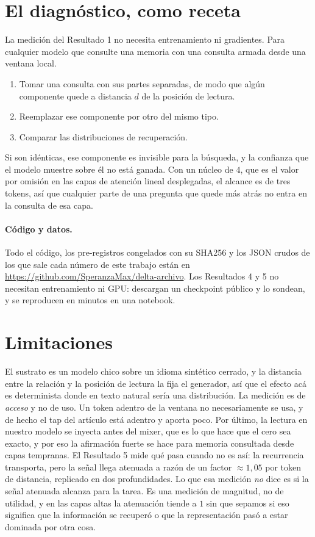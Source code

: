 \documentclass[11pt,a4paper]{article}
\begin{document}
\section{El diagnóstico, como receta}

La medición del Resultado 1 no necesita entrenamiento ni gradientes. Para cualquier modelo que
consulte una memoria con una consulta armada desde una ventana local.

\begin{enumerate}
\item Tomar una consulta con sus partes separadas, de modo que algún componente quede a distancia $d$
de la posición de lectura.
\item Reemplazar ese componente por otro del mismo tipo.
\item Comparar las distribuciones de recuperación.
\end{enumerate}

Si son idénticas, ese componente es invisible para la búsqueda, y la confianza que el modelo muestre
sobre él no está ganada. Con un núcleo de $4$, que es el valor por omisión en las capas de atención
lineal desplegadas, el alcance es de tres tokens, así que cualquier parte de una pregunta que quede
más atrás no entra en la consulta de esa capa.

\paragraph{Código y datos.} Todo el código, los pre-registros congelados con su SHA256 y los JSON
crudos de los que sale cada número de este trabajo están en
\url{https://github.com/SperanzaMax/delta-archivo}. Los Resultados 4 y 5 no necesitan entrenamiento ni
GPU: descargan un checkpoint público y lo sondean, y se reproducen en minutos en una notebook.

\section{Limitaciones}

El sustrato es un modelo chico sobre un idioma sintético cerrado, y la distancia entre la relación y
la posición de lectura la fija el generador, así que el efecto acá es determinista donde en texto
natural sería una distribución. La medición es de \emph{acceso} y no de uso. Un token adentro de la
ventana no necesariamente se usa, y de hecho el tap del artículo está adentro y aporta poco. Por
último, la lectura en nuestro modelo se inyecta antes del mixer, que es lo que hace que el cero sea
exacto, y por eso la afirmación fuerte se hace para memoria consultada desde capas tempranas. El
Resultado 5 mide qué pasa cuando no es así: la recurrencia transporta, pero la señal llega atenuada a
razón de un factor $\approx 1{,}05$ por token de distancia, replicado en dos profundidades. Lo que
esa medición \emph{no} dice es si la señal atenuada alcanza para la tarea. Es una medición de
magnitud, no de utilidad, y en las capas altas la atenuación tiende a $1$ sin que sepamos si eso
significa que la información se recuperó o que la representación pasó a estar dominada por otra cosa.
\end{document}
